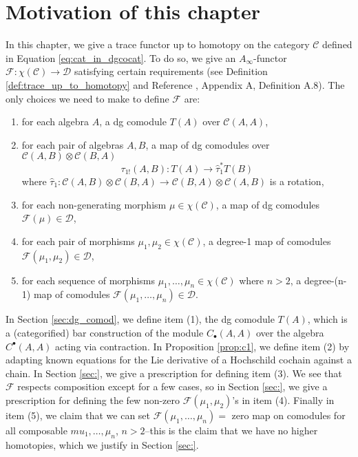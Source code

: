 \section{Motivation of this chapter}
In this chapter, we give a trace functor 
up to homotopy on the category $\mathcal{C}$ 
defined in Equation \ref{eq:cat_in_dgcocat}. 
To do so, we give an $A_\infty$-functor 
$\mathcal{F}: \chi(\mathcal{C}) \to 
\mathcal{D}$ satisfying 
certain requirements (see Definition 
\ref{def:trace_up_to_homotopy} and 
Reference \cite{F}, 
Appendix A, Definition A.8). The 
only choices we need to make to define 
$\mathcal{F}$ are:
\begin{enumerate}
	\item for each algebra $A$, 
	a dg comodule $T(A)$ over 
	$\mathcal{C}(A, A)$, 
	\item for each pair of algebras $A,B$, 
	a map of dg comodules over 
	$\mathcal{C}(A,B) \otimes \mathcal{C}(B,A)$
	$$\tau_{1!}(A,B):T(A) \to \hat{\tau}_1^* T(B)$$
	where $\hat{\tau}_1: \mathcal{C}(A,B) \otimes 
	\mathcal{C}(B,A) \to \mathcal{C}(B,A) \otimes 
	\mathcal{C}(A,B)$ is a rotation,
	\item for each non-generating 
	morphism $\mu \in \chi(\mathcal{C})$, 
	a map of dg comodules $\mathcal{F}(\mu) \in 
	\mathcal{D}$,
	\item for each pair of morphisms $\mu_1, \mu_2 
	\in \chi(\mathcal{C})$, 
	a degree-1 map of comodules 
	$\mathcal{F}(\mu_1, \mu_2) \in 
	\mathcal{D}$, 
	\item for each sequence of morphisms 
	$\mu_1, \dots, \mu_n \in \chi(\mathcal{C})$ 
	where $n>2$, a degree-(n-1) map of comodules 
	$\mathcal{F}(\mu_1, \dots, \mu_n) \in 
	\mathcal{D}$.
\end{enumerate}
In Section \ref{sec:dg_comod}, we define item (1), the dg 
comodule $T(A)$, which is a (categorified) bar 
construction of the module $C_{\bullet}(A,A)$ over 
the algebra $C^\bullet(A,A)$ acting via contraction. 
In Proposition \ref{prop:c1}, we define item (2) by 
adapting known equations for the Lie derivative of a 
Hochschild cochain against a chain. 
In Section \ref{sec:}, we give a prescription for 
defining item (3). We see that $\mathcal{F}$ 
respects composition except for a few cases, so 
in Section \ref{sec:}, we give a prescription for 
defining the few non-zero $\mathcal{F}(\mu_1, \mu_2)$'s 
in item (4). Finally in item (5), we claim that we can set 
$\mathcal{F}(\mu_1, \dots, \mu_n) = $ zero map 
on comodules for all composable $mu_1, \dots, \mu_n$, 
$n>2$--this is the claim that we have no higher 
homotopies, which we justify in Section \ref{sec:}.
